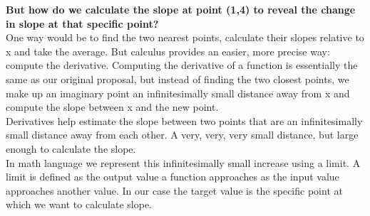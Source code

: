 \documentclass{beamer}
\begin{document}
\begin{frame}
	\begin{flushleft}
		\textbf{But how do we calculate the slope at point (1,4) to reveal the change in slope at that specific point?} \\
\vspace{5pt}
		One way would be to find the two nearest points, calculate their slopes relative to x and take the average. But calculus provides an easier, more precise way: compute the derivative. Computing the derivative of a function is essentially the same as our original proposal, but instead of finding the two closest points, we make up an imaginary point an infinitesimally small distance away from x and compute the slope between x and the new point. \\
\vspace{5pt}
		Derivatives help estimate the slope between two points that are an infinitesimally small distance away from each other. A very, very, very small distance, but large enough to calculate the slope. \\ 
\vspace{5pt}
		In math language we represent this infinitesimally small increase using a limit. A limit is defined as the output value a function approaches as the input value approaches another value. In our case the target value is the specific point at which we want to calculate slope.
	\end{flushleft}
\end{frame}
	
\end{document}
